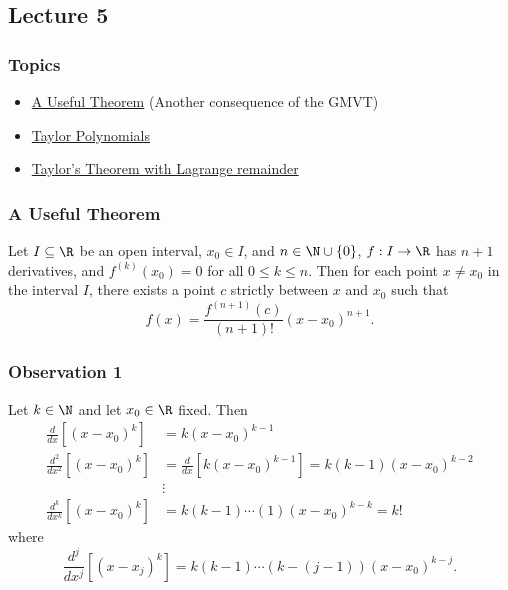 \subsection{Lecture 5}

\subsubsection{Topics}

\begin{itemize}
    \item {\hyperref[A Useful Theorem]{A Useful Theorem}} (Another consequence of the GMVT)
    \item {\hyperref[Taylor Polynomials]{Taylor Polynomials}}
    \item {\hyperref[Taylor's Theorem with Lagrange remainder]{Taylor's Theorem with Lagrange remainder}}  
\end{itemize}

\subsubsection{A Useful Theorem}\label{A Useful Theorem}


\begin{corollary}
    Let \( I \subseteq  \R   \) be an open interval, \( {x}_{0} \in I  \), and \( n \in \N \cup \{ 0 \}  \), \( f: I \to \R  \) has \( n + 1  \) derivatives, and \( f^{(k)}({x}_{0}) = 0  \) for all \( 0 \leq k \leq n  \). Then for each point \( x \neq {x}_{0} \) in the interval \( I  \), there exists a point \( c  \) strictly between \( x  \) and \( {x}_{0} \) such that 
    \[  f(x) = \frac{ f^{(n+1)}(c) }{ (n+1)! } (x-{x}_{0})^{n+1}. \]
\end{corollary}

\subsubsection{Observation 1}

Let \( k \in \N  \) and let \( {x}_{0} \in \R  \) fixed. Then
\begin{align*}
    \frac{ d }{ dx } [(x - {x}_{0})^{k}] &= k (x - {x}_{0})^{k-1} \\
    \frac{ d^{2} }{ d x^{2} } [(x- {x}_{0})^{k}] &= \frac{ d  }{  d x  }  [ k (x - {x}_{0})^{k-1}] = k (k - 1) (x - {x}_{0})^{k - 2} \\
                                                 &\vdots \\
    \frac{ d^{k }  }{  d x^{k } }  [(x - {x}_{0})^{k}] &= k (k -1)\cdots (1) (x - {x}_{0})^{k - k} = k!
\end{align*}
where 
\[  \frac{ d^{j} }{  d x^{j } }  [(x - {x}_{j})^{k}] = k (k - 1) \cdots ( k - (j -1)) (x - {x}_{0})^{k - j}.   \]

